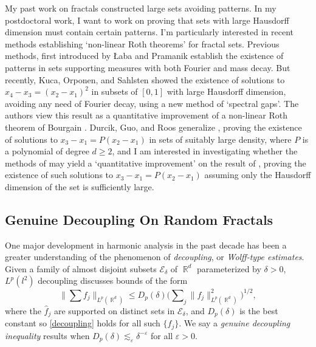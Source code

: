 \documentclass[11pt]{article}
\theoremstyle{definition}
\DeclareMathOperator{\RR}{\mathbb{R}}
\begin{document}
My past work on fractals constructed large sets avoiding patterns. In my postdoctoral work, I want to work on proving that sets with large Hausdorff dimension must contain certain patterns. I'm particularly interested in recent methods establishing `non-linear Roth theorems' for fractal sets. Previous methods, first introduced by {\L}aba and Pramanik \cite{LabaPramanik} %
establish the existence of patterns in sets supporting measures with both Fourier and mass decay. But recently, Kuca, Orponen, and Sahlsten \cite{KucaOrponenSahlsten} showed the existence of solutions to $x_4 - x_3 = (x_2 - x_1)^2$ in subsets of $[0,1]$ with large Hausdorff dimension, avoiding any need of Fourier decay, using a new method of `spectral gaps'. The authors view this result as a quantitative improvement of a non-linear Roth theorem of Bourgain \cite{Bourgain2}. Durcik, Guo, and Roos \cite{DurcikGuoRoos} generalize \cite{Bourgain2}, proving the existence of solutions to $x_3 - x_1 = P(x_2 - x_1)$ in sets of suitably large density, where $P$ is a polynomial of degree $d \geq 2$, and I am interested in investigating whether the methods of \cite{KucaOrponenSahlsten} may yield a `quantitative improvement' on the result of \cite{DurcikGuoRoos}, proving the existence of such solutions to $x_3 - x_1 = P(x_2 - x_1)$ assuming only the Hausdorff dimension of the set is sufficiently large.

\subsection*{Genuine Decoupling On Random Fractals}

One major development in harmonic analysis in the past decade has been a greater understanding of the phenomenon of \emph{decoupling}, or \emph{Wolff-type estimates}. Given a family of almost disjoint subsets $\mathcal{E}_\delta$ of $\RR^d$ parameterized by $\delta > 0$, $L^p(l^2)$ decoupling discusses bounds of the form
%
\begin{equation} \label{decoupling}
    \Big\| \sum f_j \Big\|_{L^p(\RR^d)} \leq D_p(\delta) \Big( \sum\nolimits_j \| f_j \|_{L^p(\RR^d)}^2 \Big)^{1/2},
\end{equation}
%
where the $\widehat{f}_j$ are supported on distinct sets in $\mathcal{E}_\delta$, and $D_p(\delta)$ is the best constant so \eqref{decoupling} holds for all such $\{ f_j \}$. We say a \emph{genuine decoupling inequality} results when $D_p(\delta) \lesssim_\varepsilon \delta^{-\varepsilon}$ for all $\varepsilon > 0$.%
\end{document}
